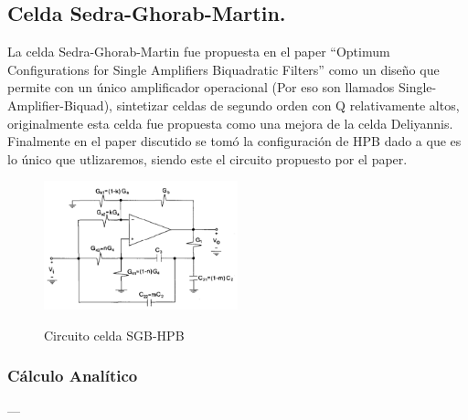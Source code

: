 \subsection{Celda Sedra-Ghorab-Martin.}
La celda Sedra-Ghorab-Martin fue propuesta en el paper ``Optimum Configurations for Single Amplifiers Biquadratic Filters'' como un diseño que permite con un único amplificador operacional (Por eso son llamados Single-Amplifier-Biquad), sintetizar celdas de segundo orden con Q relativamente altos, originalmente esta celda fue propuesta como una mejora de la celda Deliyannis.
Finalmente en el paper discutido se tomó la configuración de HPB dado a que es lo único que utlizaremos, siendo este el circuito propuesto por el paper.
\begin{figure}[H]
	\centering
	\includegraphics[width=0.5\textwidth]{Imagenes-Ej3/HPBSedra.PNG}
	\label{fig:HPBSedra}
	\caption{Circuito celda SGB-HPB}
\end{figure}
\subsubsection{Cálculo Analítico}
---
